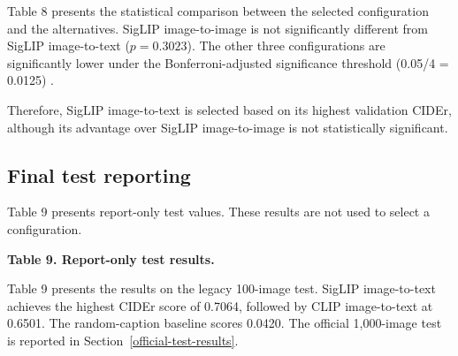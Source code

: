\documentclass{article}
\begin{document}
Table 8 presents the statistical comparison between the selected
configuration and the alternatives. SigLIP image-to-image is not
significantly different from SigLIP image-to-text
(\(p=0.3023\)). The other three configurations are significantly
lower under the Bonferroni-adjusted significance threshold (0.05/4 = 0.0125) \cite{cohen_statistical_2013}.

Therefore, SigLIP image-to-text is selected based on its highest
validation CIDEr, although its advantage over SigLIP image-to-image
is not statistically significant.

\subsection{Final test reporting}\label{final-test-reporting}

Table 9 presents report-only test values.
These results are not used to select a configuration.

\begin{center}
\textbf{Table 9. Report-only test results.}
\end{center}
\label{tab:test-results}

\begin{table}[htbp]
\centering
{}
\end{table}

Table 9 presents the results on the legacy 100-image test. SigLIP
image-to-text achieves the highest CIDEr score of 0.7064, followed by CLIP
image-to-text at 0.6501. The random-caption baseline scores 0.0420.
The official 1,000-image test is reported in Section~\ref{official-test-results}.
\end{document}
